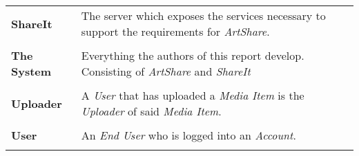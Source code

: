 \documentclass[../report.tex]{subfiles}
\begin{document}
\begin{longtable}{l p{10 cm}}
\textbf{ShareIt} & The server which exposes the services necessary to support the requirements for \textit{ArtShare}.\\ \\
\textbf{The System} & Everything the authors of this report develop. Consisting of \textit{ArtShare} and \textit{ShareIt} \\ \\
\textbf{Uploader} & A \textit{User} that has uploaded a \textit{Media Item} is the \textit{Uploader} of said \textit{Media Item}. \\ \\
\textbf{User} & An \textit{End User} who is logged into an \textit{Account}.\\ \\
\end{longtable}
\end{document}
